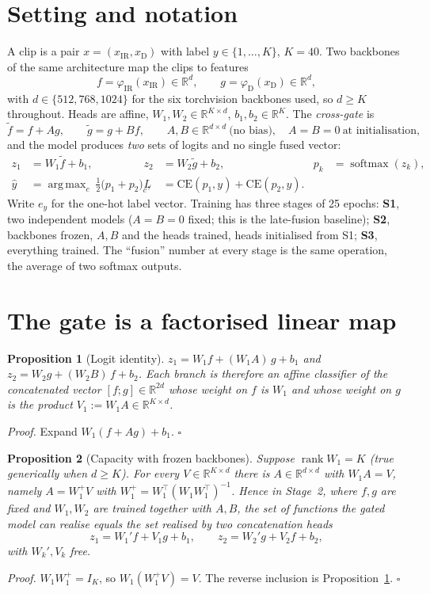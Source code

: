 \documentclass[11pt,a4paper]{article}
\theoremstyle{plain}
\newtheorem{prop}{Proposition}
\theoremstyle{remark}
\newcommand{\IR}{\mathrm{IR}}
\newcommand{\Dp}{\mathrm{D}}
\newcommand{\CE}{\mathrm{CE}}
\newcommand{\R}{\mathbb{R}}
\DeclareMathOperator{\rank}{rank}
\DeclareMathOperator{\softmax}{softmax}
\DeclareMathOperator*{\argmax}{arg\,max}
\begin{document}
\section{Setting and notation}

A clip is a pair $x=(x_\IR,x_\Dp)$ with label $y\in\{1,\dots,K\}$, $K=40$. Two backbones of the same architecture map the clips to features
\[
f=\varphi_\IR(x_\IR)\in\R^d,\qquad g=\varphi_\Dp(x_\Dp)\in\R^d,
\]
with $d\in\{512,768,1024\}$ for the six torchvision backbones used, so $d\ge K$ throughout. Heads are affine, $W_1,W_2\in\R^{K\times d}$, $b_1,b_2\in\R^K$. The \emph{cross-gate} is
\begin{equation}
\tilde f=f+Ag,\qquad \tilde g=g+Bf,\qquad A,B\in\R^{d\times d}\ \text{(no bias)},\quad A=B=0\ \text{at initialisation,}
\label{eq:gate}
\end{equation}
and the model produces \emph{two} sets of logits and no single fused vector:
\begin{align}
z_1&=W_1\tilde f+b_1, & z_2&=W_2\tilde g+b_2, & p_k&=\softmax(z_k),\\
\hat y&=\argmax_c\ \tfrac12\bigl(p_1+p_2\bigr)_c, & L&=\CE(p_1,y)+\CE(p_2,y).
\end{align}
Write $e_y$ for the one-hot label vector. Training has three stages of 25 epochs: \textbf{S1}, two independent models ($A=B=0$ fixed; this is the late-fusion baseline); \textbf{S2}, backbones frozen, $A,B$ and the heads trained, heads initialised from S1; \textbf{S3}, everything trained. The ``fusion'' number at every stage is the same operation, the average of two softmax outputs.

\section{The gate is a factorised linear map}

\begin{prop}[Logit identity]\label{prop:logit}
$z_1=W_1f+(W_1A)\,g+b_1$ and $z_2=W_2g+(W_2B)\,f+b_2$. Each branch is therefore an affine classifier of the concatenated vector $[f;g]\in\R^{2d}$ whose weight on $f$ is $W_1$ and whose weight on $g$ is the product $V_1:=W_1A\in\R^{K\times d}$.
\end{prop}
\noindent\emph{Proof.} Expand $W_1(f+Ag)+b_1$. \hfill$\square$

\begin{prop}[Capacity with frozen backbones]\label{prop:cap}
Suppose $\rank W_1=K$ (true generically when $d\ge K$). For every $V\in\R^{K\times d}$ there is $A\in\R^{d\times d}$ with $W_1A=V$, namely $A=W_1^{+}V$ with $W_1^{+}=W_1^\top(W_1W_1^\top)^{-1}$. Hence in Stage~2, where $f,g$ are fixed and $W_1,W_2$ are trained together with $A,B$, the set of functions the gated model can realise equals the set realised by two \emph{concatenation heads}
\[
z_1=W_1'f+V_1g+b_1,\qquad z_2=W_2'g+V_2f+b_2 ,
\]
with $W_k',V_k$ free.
\end{prop}
\noindent\emph{Proof.} $W_1W_1^{+}=I_K$, so $W_1(W_1^{+}V)=V$. The reverse inclusion is Proposition~\ref{prop:logit}. \hfill$\square$
\end{document}
